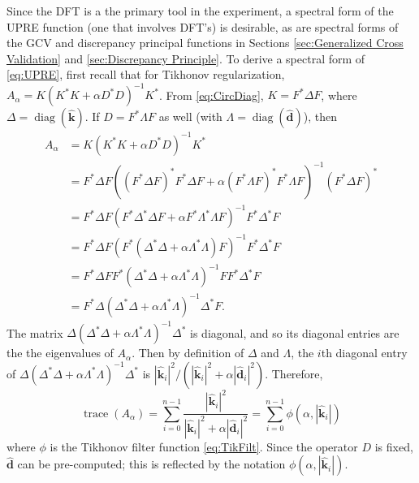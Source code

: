 \documentclass[12pt]{article}
\newcommand{\kdis}{\mathbf{k}}
\newcommand{\kmat}{K}	%
\newcommand{\ddis}{\mathbf{d}}	%
\newcommand{\ctrans}{*}	%
\newcommand{\trace}{\operatorname{trace}}	%
\newcommand{\diag}{\operatorname{diag}}	%
\newcommand{\regparam}{\alpha}
\newcommand{\filt}{\phi}
\newcommand{\A}{A_{\regparam}}	%
\begin{document}
Since the DFT is a the primary tool in the experiment, a spectral form of the UPRE function (one that involves DFT's) is desirable, as are spectral forms of the GCV and discrepancy principal functions in Sections \ref{sec:Generalized Cross Validation} and \ref{sec:Discrepancy Principle}. To derive a spectral form of \eqref{eq:UPRE}, first recall that for Tikhonov regularization, $\A = \kmat(\kmat^\ctrans\kmat + \regparam{D^\ctrans}D)^{-1}\kmat^\ctrans$. From \eqref{eq:CircDiag}, $\kmat = F^*\Delta{F}$, where $\Delta = \diag(\widehat{\kdis})$. If $D = F^\ctrans\Lambda{F}$ as well (with $\Lambda = \diag(\widehat{\ddis})$), then
\begin{align*}
\A &= \kmat(\kmat^\ctrans\kmat + \regparam{D^\ctrans}D)^{-1}\kmat^\ctrans \\
&= F^*\Delta{F}((F^*\Delta{F})^\ctrans F^\ctrans\Delta{F} + \regparam(F^\ctrans\Lambda{F})^\ctrans F^\ctrans\Lambda{F})^{-1}(F^*\Delta{F})^\ctrans \\
&= F^\ctrans\Delta{F}(F^\ctrans\Delta^\ctrans\Delta{F} + \regparam{F^\ctrans\Lambda^\ctrans\Lambda{F}})^{-1}F^\ctrans\Delta^\ctrans{F} \\
&= F^\ctrans\Delta{F}(F^\ctrans(\Delta^\ctrans\Delta + \regparam\Lambda^\ctrans\Lambda)F)^{-1}F^\ctrans\Delta^\ctrans{F} \\
&= F^\ctrans\Delta{F}F^\ctrans(\Delta^\ctrans\Delta + \regparam\Lambda^\ctrans\Lambda)^{-1}FF^\ctrans\Delta^\ctrans{F} \\
&= F^\ctrans\Delta(\Delta^\ctrans\Delta + \regparam\Lambda^\ctrans\Lambda)^{-1}\Delta^\ctrans{F}.
\end{align*}
The matrix $\Delta(\Delta^\ctrans\Delta + \regparam\Lambda^\ctrans\Lambda)^{-1}\Delta^\ctrans$ is diagonal, and so its diagonal entries are the the eigenvalues of $\A$. Then by definition of $\Delta$ and $\Lambda$, the $i$th diagonal entry of $\Delta(\Delta^\ctrans\Delta + \regparam\Lambda^\ctrans\Lambda)^{-1}\Delta^\ctrans$ is $|\widehat{\kdis}_i|^2/(|\widehat{\kdis}_i|^2 + \regparam|\widehat{\ddis}_i|^2)$. Therefore,
\begin{equation}
\trace(\A) = \sum_{i = 0}^{n-1} \frac{|\widehat{\kdis}_i|^2}{|\widehat{\kdis}_i|^2 + \regparam|\widehat{\ddis}_i|^2} = \sum_{i = 0}^{n-1} \filt(\regparam,|\widehat{\kdis}_i|)
\label{eq:TraceUPRE}
\end{equation}
where $\filt$ is the Tikhonov filter function \eqref{eq:TikFilt}. Since the operator $D$ is fixed, $\widehat{\ddis}$ can be pre-computed; this is reflected by the notation $\filt(\regparam,|\widehat{\kdis}_i|)$. \par
\end{document}
